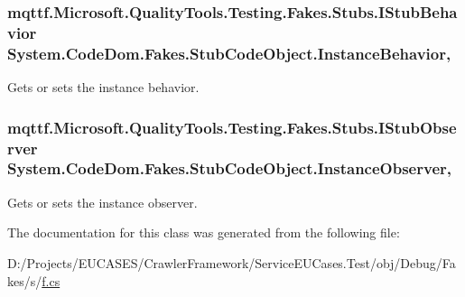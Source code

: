 \hypertarget{class_system_1_1_code_dom_1_1_fakes_1_1_stub_code_object_a80cb82a1ae8d5f6825d387b52cf4c963}{
\subsubsection[{Instance\-Behavior}]{\setlength{\rightskip}{0pt plus 5cm}mqttf.\-Microsoft.\-Quality\-Tools.\-Testing.\-Fakes.\-Stubs.\-I\-Stub\-Behavior System.\-Code\-Dom.\-Fakes.\-Stub\-Code\-Object.\-Instance\-Behavior\hspace{0.3cm}{\ttfamily [get]}, {\ttfamily [set]}}}\label{class_system_1_1_code_dom_1_1_fakes_1_1_stub_code_object_a80cb82a1ae8d5f6825d387b52cf4c963}


Gets or sets the instance behavior.

\hypertarget{class_system_1_1_code_dom_1_1_fakes_1_1_stub_code_object_adc60fe2ed126b7798e130328600df006}{
\subsubsection[{Instance\-Observer}]{\setlength{\rightskip}{0pt plus 5cm}mqttf.\-Microsoft.\-Quality\-Tools.\-Testing.\-Fakes.\-Stubs.\-I\-Stub\-Observer System.\-Code\-Dom.\-Fakes.\-Stub\-Code\-Object.\-Instance\-Observer\hspace{0.3cm}{\ttfamily [get]}, {\ttfamily [set]}}}\label{class_system_1_1_code_dom_1_1_fakes_1_1_stub_code_object_adc60fe2ed126b7798e130328600df006}


Gets or sets the instance observer.



The documentation for this class was generated from the following file\-:\begin{DoxyCompactItemize}
\item 
D\-:/\-Projects/\-E\-U\-C\-A\-S\-E\-S/\-Crawler\-Framework/\-Service\-E\-U\-Cases.\-Test/obj/\-Debug/\-Fakes/s/\hyperlink{s_2f_8cs}{f.\-cs}\end{DoxyCompactItemize}
